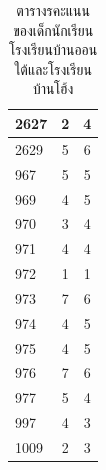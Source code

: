 \begin{table}[h]
\begin{center}
\begin{tabular}{ |l|c|c| }
            \hline
            2627 & 2 & 4\\
            \hline
            2629 & 5 & 6\\
            \hline
            967 & 5 & 5\\
            \hline
            969 & 4 & 5\\
            \hline
            970 & 3 & 4\\
            \hline
            971 & 4 & 4\\
            \hline
            972 & 1 & 1\\
            \hline
            973 & 7 & 6\\
            \hline
            974 & 4 & 5\\
            \hline
            975 & 4 & 5\\
            \hline
            976 & 7 & 6\\
            \hline
            977 & 5 & 4\\
            \hline
            997 & 4 & 3\\
            \hline
            1009 & 2 & 3\\
            \hline
        \end{tabular}
    \end{center}
    \caption[ตารางคะแนนของเด็กนักเรียนโรงเรียนบ้านออนใต้และโรงเรียนบ้านโฮ้ง]{ตารางรคะแนนของเด็กนักเรียนโรงเรียนบ้านออนใต้และโรงเรียนบ้านโฮ้ง}
    \label{studentsscoretable}
\end{table}
